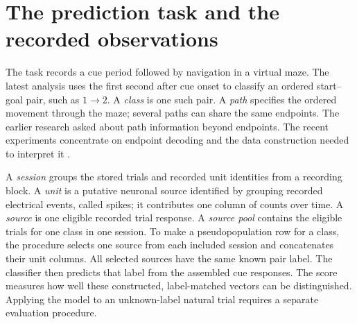\documentclass[10pt,a4paper]{article}
\begin{document}
\begin{abstract}
\noindent Using more distinct recorded training trials improved CEBRA-Time decoding in the latest nine-class study. With 17 recorded units, increasing from two to five training trials per session and class raised mean start--goal balanced accuracy from 16.67\% to 46.30\% with a support-vector classifier. Choosing CEBRA also requires comparing the complete encoder--classifier combination: at five trials, raw counts with the same classifier reached 59.72\%, while CEBRA-Time led the nearest-neighbor and linear-discriminant comparisons. Expanding the population from 17 to 49 to 83 units raised PCA/support-vector means from 33.33\% to 68.06\% to 72.22\%; the last step improved one of three repeats. This synthesis explains how those results depend on source availability, class selection and assembly of cross-session \emph{pseudopopulations}: vectors whose recording blocks are selected using a known start--goal label. Evaluation uses different contributing trials from the training set, drawn from the same sessions. The development data have been examined repeatedly during the research series, so the results guide exploratory comparisons. Earlier path and endpoint studies explain the present design; complete notebook reproduction confirms repeatability on the same recordings. The evidence supports decisions about the tested input constructions and readouts. Performance on unknown-label natural trials, biological replication and recovery of ordered navigation paths remain open.
\end{abstract}

\section{The prediction task and the recorded observations}
The task records a cue period followed by navigation in a virtual maze. The latest analysis uses the first second after cue onset to classify an ordered start--goal pair, such as $1\to2$. A \emph{class} is one such pair. A \emph{path} specifies the ordered movement through the maze; several paths can share the same endpoints. The earlier research asked about path information beyond endpoints. The recent experiments concentrate on endpoint decoding and the data construction needed to interpret it \cite{history,contract}.

A \emph{session} groups the stored trials and recorded unit identities from a recording block. A \emph{unit} is a putative neuronal source identified by grouping recorded electrical events, called spikes; it contributes one column of counts over time. A \emph{source} is one eligible recorded trial response. A \emph{source pool} contains the eligible trials for one class in one session. To make a pseudopopulation row for a class, the procedure selects one source from each included session and concatenates their unit columns. All selected sources have the same known pair label. The classifier then predicts that label from the assembled cue responses. The score measures how well these constructed, label-matched vectors can be distinguished. Applying the model to an unknown-label natural trial requires a separate evaluation procedure.
\end{document}

